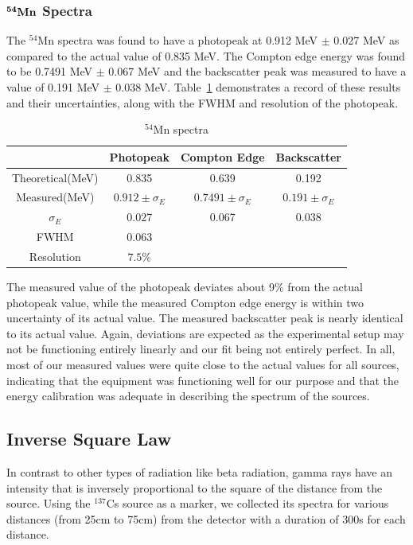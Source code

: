 \documentclass[%
 aip,
rsi,%
 amsmath,amssymb,
 reprint,%
author-numerical,%
]{revtex4-1}
\begin{document}
\subsubsection{$\bf{ ^ { 54 }Mn }$ Spectra }
The $^ { 54 }$Mn  spectra was found to have a photopeak at 0.912 MeV $\pm$ 0.027 MeV as compared to the actual value of 0.835 MeV. The Compton edge energy was found to be 0.7491 MeV $\pm$ 0.067 MeV and the backscatter peak was measured to have a value of 0.191 MeV $\pm$ 0.038 MeV. Table~\ref{tab:table4} demonstrates a record of these results and their uncertainties, along with the FWHM and resolution of the photopeak.

\begin{table}[H]
\caption{\label{tab:table4}$\mathrm { ^ { 54 }Mn } $ spectra }
\begin{ruledtabular}
\begin{tabular}{cccc}
&Photopeak&Compton Edge&Backscatter\\
\hline
Theoretical(MeV)&0.835&0.639 &0.192 \\
\hline
Measured(MeV)&$0.912\pm\sigma_E$&$0.7491\pm\sigma_E$&$0.191\pm\sigma_E$\\
\hline
$\sigma_E$ &0.027&0.067 &0.038 \\
\hline
FWHM &0.063 &  & \\
\hline
Resolution &$7.5\%$ &  & \\
\end{tabular}
\end{ruledtabular}
\end{table}
The measured value of the photopeak deviates about 9$\%$ from the actual photopeak value, while the measured Compton edge energy is within two uncertainty of its actual value. The measured backscatter peak is nearly identical to its actual value. Again, deviations are expected as the experimental setup may not be functioning entirely linearly and our fit being not entirely perfect. In all, most of our measured values were quite close to the actual values for all sources, indicating that the equipment was functioning well for our purpose and that the energy calibration was adequate in describing the spectrum of the sources.

\subsection{ Inverse Square Law}
In contrast to other types of radiation like beta radiation, gamma rays have an intensity that is inversely proportional to the square of the distance from the source. Using the $^ { 137 }$Cs source as a marker, we collected its spectra for various distances (from 25cm to 75cm) from the detector with a duration of 300s for each distance.
\end{document}
